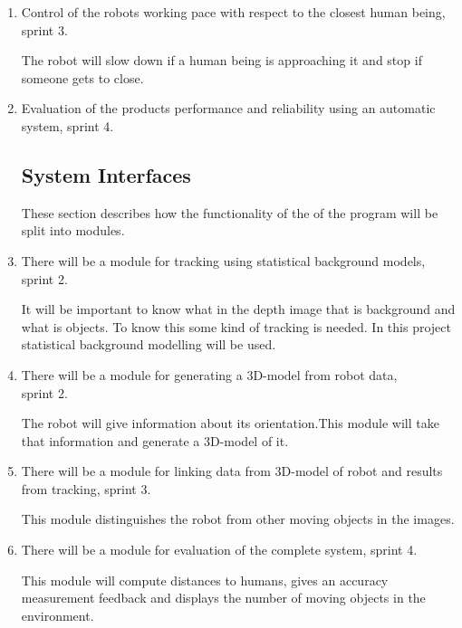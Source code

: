 \documentclass[10pt,a4paper]{article}
\begin{document}
\begin{enumerate}
\item Control of the robots working pace with respect to the closest human being, sprint 3.

{\addtolength{\leftskip}{5mm}The robot will slow down if a human being is approaching it and stop if someone gets to close.\par}

\item Evaluation of the products performance and reliability using an automatic system, sprint 4.

\subsection{System Interfaces}
These section describes how the functionality of the of the program will be split into modules.

\item There will be a module for tracking using statistical background models, sprint 2.

{\addtolength{\leftskip}{5mm}It will be important to know what in the depth image that is background and what is objects. To know this some kind of tracking is needed. In this project statistical background modelling will be used.\par}
\item There will be a module for generating a 3D-model from robot data,\\ sprint 2.
 
{\addtolength{\leftskip}{5mm}The robot will give information about its orientation.This module will take that information and generate a 3D-model of it.\par}
 
 \item There will be a module for linking data from 3D-model of robot and results from tracking, sprint 3.

{\addtolength{\leftskip}{5mm}This module distinguishes the robot from other moving objects in the images.\par}

\item There will be a module for evaluation of the complete system, sprint 4.

{\addtolength{\leftskip}{5mm}This module will compute distances to humans, gives an accuracy measurement feedback and displays the number of moving objects in the environment. 
\par}


\end{enumerate}
\end{document}
